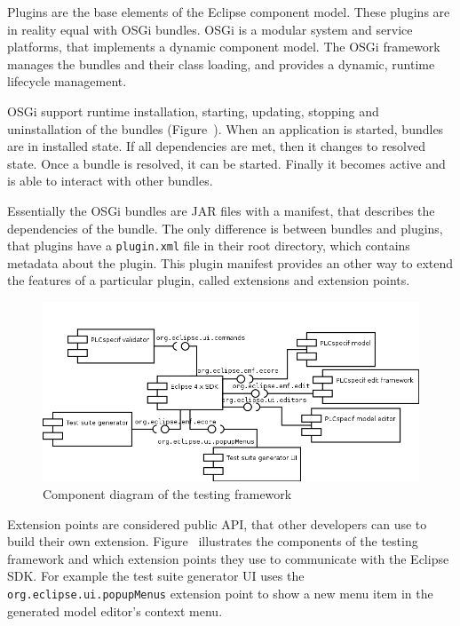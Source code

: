 Plugins are the base elements of the Eclipse component model. These plugins are in reality equal with OSGi bundles. OSGi is a modular system and service platforms, that implements a dynamic component model. The OSGi framework manages the bundles and their class loading, and provides a dynamic, runtime lifecycle management.

OSGi support runtime installation, starting, updating, stopping and uninstallation of the bundles (Figure~\cite{fig:designosgi}). When an application is started, bundles are in installed state. If all dependencies are met, then it changes to resolved state. Once a bundle is resolved, it can be started. Finally it becomes active and is able to interact with other bundles.

Essentially the OSGi bundles are JAR files with a manifest, that describes the dependencies of the bundle. The only difference is between bundles and plugins, that plugins have a \texttt{plugin.xml} file in their root directory, which contains metadata about the plugin. This plugin manifest provides an other way to extend the features of a particular plugin, called extensions and extension points.

\begin{figure}[htp]
\centering
\includegraphics[scale=0.5]{figures/design_components.png}
\caption{Component diagram of the testing framework}
\label{fig:designcomponents}
\end{figure}

Extension points are considered public API, that other developers can use to build their own extension. Figure~\cite{fig:designcomponents} illustrates the components of the testing framework and which extension points they use to communicate with the Eclipse SDK. For example the test suite generator UI uses the \texttt{org.eclipse.ui.popupMenus} extension point to show a new menu item in the generated model editor's context menu.

